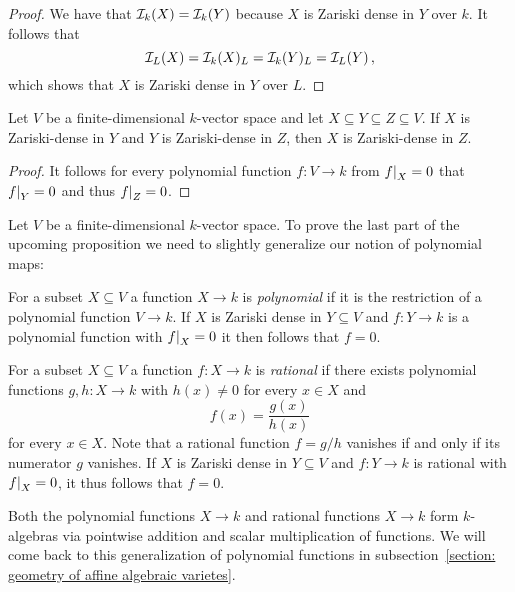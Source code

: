 \begin{proof}
  We have that $\mathcal{I}_k(X) = \mathcal{I}_k(Y)$ because $X$ is Zariski dense in $Y$ over $k$.
  It follows that
  \[
      \mathcal{I}_L(X)
    = \mathcal{I}_k(X)_L
    = \mathcal{I}_k(Y)_L
    = \mathcal{I}_L(Y) \,,
  \]
  which shows that $X$ is Zariski dense in $Y$ over $L$.
\end{proof}


\begin{lemma}
  \label{lemma: transitivity of Zariski density}
  Let $V$ be a finite-dimensional $k$-vector space and let $X \subseteq Y \subseteq Z \subseteq V$.
  If $X$ is Zariski-dense in $Y$ and $Y$ is Zariski-dense in $Z$, then $X$ is Zariski-dense in $Z$.
\end{lemma}


\begin{proof}
  It follows for every polynomial function $f \colon V \to k$ from $\restrict{f}{X} = 0$ that $\restrict{f}{Y} = 0$ and thus $\restrict{f}{Z} = 0$.
\end{proof}


\begin{fluff}
  Let $V$ be a finite-dimensional $k$-vector space.
  To prove the last part of the upcoming proposition we need to slightly generalize our notion of polynomial maps:
  
  For a subset $X \subseteq V$ a function $X \to k$ is \emph{polynomial} if it is the restriction of a polynomial function $V \to k$.
  If $X$ is Zariski dense in $Y \subseteq V$ and $f \colon Y \to k$ is a polynomial function with $\restrict{f}{X} = 0$ it then follows that $f = 0$.
  
  For a subset $X \subseteq V$ a function $f \colon X \to k$ is \emph{rational} if there exists polynomial functions $g, h \colon X \to k$ with $h(x) \neq 0$ for every $x \in X$ and
  \[
      f(x)
    = \frac{g(x)}{h(x)}
  \]
  for every $x \in X$.
  Note that a rational function $f = g/h$ vanishes if and only if its numerator $g$ vanishes.
  If $X$ is Zariski dense in $Y \subseteq V$ and $f \colon Y \to k$ is rational with $\restrict{f}{X} = 0$, it thus follows that $f = 0$.
  
  Both the polynomial functions $X \to k$ and rational functions $X \to k$ form $k$-algebras via pointwise addition and scalar multiplication of functions.
  We will come back to this generalization of polynomial functions in subsection~\ref{section: geometry of affine algebraic varietes}.
\end{fluff}



